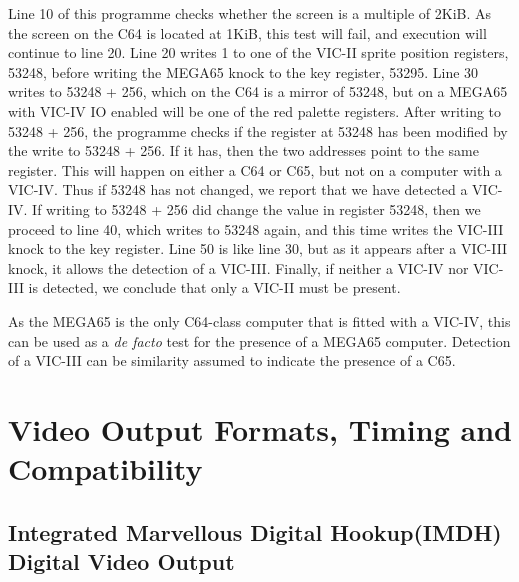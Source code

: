 
Line 10 of this programme checks whether the screen is a multiple of 2KiB.
As the screen on the C64 is located at 1KiB, this test will fail, and execution
will continue to line 20.  Line 20 writes 1 to one of the VIC-II sprite position
registers, 53248, before writing the MEGA65 knock to the key register, 53295.
Line 30 writes to 53248 + 256, which on the C64 is a mirror of 53248, but on a
MEGA65 with VIC-IV IO enabled will be one of the red palette registers.
After writing to 53248 + 256, the programme checks if the register at 53248 has
been modified by the write to 53248 + 256.  If it has, then the two addresses
point to the same register.  This will happen on either a C64 or C65, but not on
a computer with a VIC-IV.  Thus if 53248 has not changed, we report that we have detected a VIC-IV.
If writing to 53248 + 256 did change the value in register 53248, then we proceed
to line 40, which writes to 53248 again, and this time writes the VIC-III knock to
the key register.  Line 50 is like line 30, but as it appears after a VIC-III knock,
it allows the detection of a VIC-III.  Finally, if neither a VIC-IV nor VIC-III
is detected, we conclude that only a VIC-II must be present.

As the MEGA65 is the only C64-class computer that is fitted with a
VIC-IV, this can be used as a {\em de facto} test for the presence of
a MEGA65 computer. Detection of a VIC-III can be similarity assumed to
indicate the presence of a C65.

\section{Video Output Formats, Timing and Compatibility}

\subsection{Integrated Marvellous Digital Hookup\texttrademark (IMDH\texttrademark)
  Digital Video Output}

